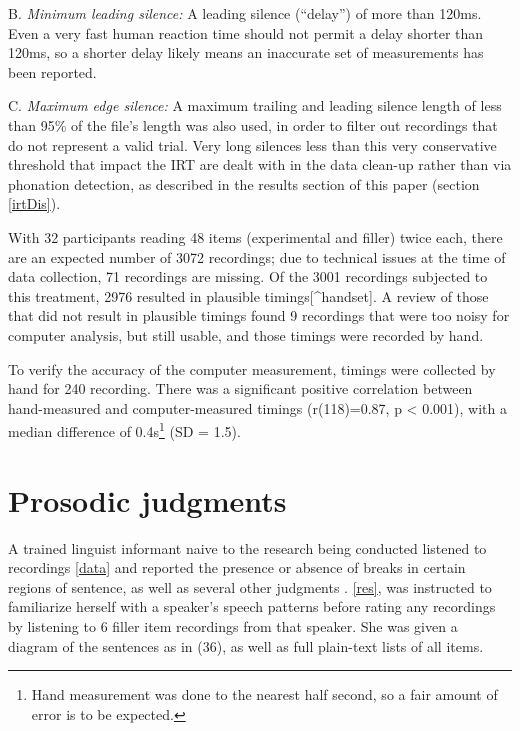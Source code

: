 \documentclass[12pt,oneside]{book}
\let\rmarkdownfootnote\footnote%
\def\footnote{\protect\rmarkdownfootnote}
\begin{document}
B. \emph{Minimum leading silence:} A leading silence (``delay'') of more than 120ms. Even a very fast human reaction time should not permit a delay shorter than 120ms, so a shorter delay likely means an inaccurate set of measurements has been reported.

C. \emph{Maximum edge silence:} A maximum trailing and leading silence length of less than 95\% of the file's length was also used, in order to filter out recordings that do not represent a valid trial. Very long silences less than this very conservative threshold that impact the IRT are dealt with in the data clean-up rather than via phonation detection, as described in the results section of this paper (section \ref{irtDis}).

With 32 participants reading 48 items (experimental and filler) twice each, there are an expected number of 3072 recordings; due to technical issues at the time of data collection, 71 recordings are missing. Of the 3001 recordings subjected to this treatment, 2976 resulted in plausible timings{[}\^{}handset{]}. A review of those that did not result in plausible timings found 9 recordings that were too noisy for computer analysis, but still usable, and those timings were recorded by hand.

To verify the accuracy of the computer measurement, timings were collected by hand for 240 recording. There was a significant positive correlation between hand-measured and computer-measured timings (r(118)=0.87, p \textless{} 0.001), with a median difference of 0.4s\footnote{Hand measurement was done to the nearest half second, so a fair amount of error is to be expected.} (SD = 1.5).

\hypertarget{sita}{%
\section{Prosodic judgments}\label{sita}}

A trained linguist informant naive to the research being conducted listened to  recordings  \ref{data}\added{)} and reported the presence or absence of breaks in certain regions of  sentence, as well as several other judgments .  \ref{res},   was instructed to familiarize herself with a speaker's speech patterns before rating any recordings by listening to 6 filler item recordings from that speaker. She was given a diagram of the sentences as in (36), as well as full plain-text lists of all items.
\end{document}
